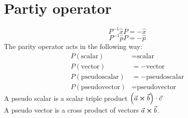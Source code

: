 \documentclass{report}
\begin{document}
\section{Partiy operator}
\[
	P^{-1} \hat{x} P = -\hat{x}
\] \[
P^{-1} \hat{p} P = - \hat{p}
\] The parity operator acts in the following way:
\begin{align*}
	P(\text{scalar}) &= \text{scalar} \\
	P(\text{vector}) &=  -\text{vector} \\
	P(\text{pseudoscalar}) &= - \text{pseudoscalar} \\
	P(\text{pseudovector}) &=  \text{pseudovector}
\end{align*}
A pseudo scalar is a scalar triple product $\left( \vec{a} \cross \vec{b} \right) \cdot \vec{c}$ \\
A pseudo vector is a cross product of vectors $\vec{a} \cross \vec{b}$.\\
\end{document}

